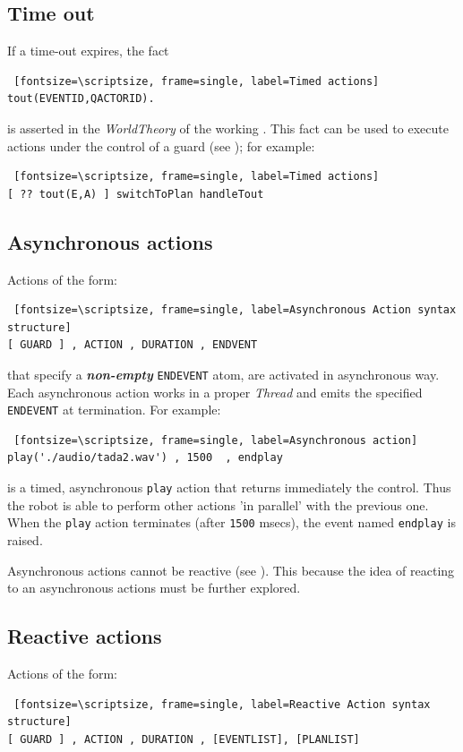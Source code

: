 \subsection{Time out}
If a time-out expires, the fact
\begin{Verbatim} [fontsize=\scriptsize, frame=single, label=Timed actions]
tout(EVENTID,QACTORID). 
\end{Verbatim} 

 
\noindent is asserted in the \textit{WorldTheory} of the working \qa. This fact can be used to execute actions under the control of a guard (see  ); for example:

\begin{Verbatim} [fontsize=\scriptsize, frame=single, label=Timed actions]
[ ?? tout(E,A) ] switchToPlan handleTout
\end{Verbatim}

\subsection{Asynchronous actions}
Actions of the form:
\begin{Verbatim} [fontsize=\scriptsize, frame=single, label=Asynchronous Action syntax structure]
[ GUARD ] , ACTION , DURATION , ENDVENT 
\end{Verbatim}

that specify  a \textit{\textbf{non-empty}} \texttt{ENDEVENT} atom, are activated in asynchronous way. Each asynchronous action works in a proper \textit{Thread} and emits the specified \texttt{ENDEVENT} at termination.
For example:
 
\begin{Verbatim} [fontsize=\scriptsize, frame=single, label=Asynchronous action]		
play('./audio/tada2.wav') , 1500  , endplay
\end{Verbatim}

\noindent is a timed, asynchronous \texttt{play} action that returns immediately the control. Thus the robot is able to perform other actions 'in parallel' with the previous one. When the \texttt{play} action terminates (after \texttt{1500} msecs), the event named \texttt{endplay} is raised.

Asynchronous actions cannot be reactive (see ). This because the idea of reacting to an asynchronous actions must be further explored.

\subsection{Reactive actions}
Actions of the form:
\begin{Verbatim} [fontsize=\scriptsize, frame=single, label=Reactive Action syntax structure]
[ GUARD ] , ACTION , DURATION , [EVENTLIST], [PLANLIST]
\end{Verbatim}

